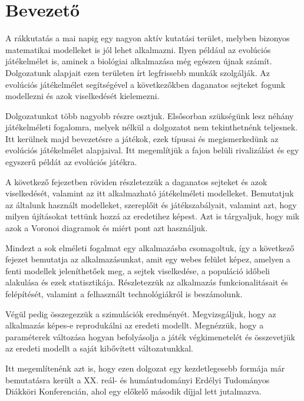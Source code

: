 \chapter{Bevezető}

A rákkutatás a mai napig egy nagyon aktív kutatási terület, melyben bizonyos matematikai modelleket is jól lehet alkalmazni. Ilyen például az evolúciós játékelmélet is, aminek a biológiai alkalmazása még egészen újnak számít. Dolgozatunk alapjait ezen területen írt legfrissebb munkák szolgálják. Az evolúciós játékelmélet segítségével a következőkben daganatos sejteket fogunk  modellezni és azok viselkedését kielemezni.

Dolgozatunkat több nagyobb részre osztjuk. Elsősorban szükségünk lesz néhány játékelméleti fogalomra, melyek nélkül a dolgozatot nem tekinthetnénk teljesnek. Itt kerülnek majd bevezetésre a játékok, ezek típusai és megismerkedünk az evolúciós játékelmélet alapjaival. Itt megemlítjük a fajon belüli rivalizálást és egy egyszerű példát az evolúciós játékra.

A következő fejezetben röviden részletezzük a daganatos sejteket és azok viselkedését, valamint az itt alkalmazható játékelméleti modelleket. Bemutatjuk az általunk használt modelleket, szereplőit és játékszabályait, valamint azt, hogy milyen újításokat tettünk hozzá az eredetihez képest. Azt is tárgyaljuk, hogy mik azok a Voronoi diagramok és miért pont azt használjuk.

Mindezt a sok elméleti fogalmat egy alkalmazásba csomagoltuk, így a következő fejezet bemutatja az alkalmazásunkat, amit egy webes felület képez, amelyen a fenti modellek jeleníthetőek meg, a sejtek viselkedése, a populáció időbeli alakulása és ezek statisztikája. Részletezzük az alkalmazás funkcionalitásait és felépítését, valamint a felhasznált technológiákról is beszámolunk.

Végül pedig összegezzük a szimulációk eredményét. Megvizsgáljuk, hogy az alkalmazás képes-e reprodukálni az eredeti modellt. Megnézzük, hogy a paraméterek változása hogyan befolyásolja a játék végkimenetelét és összevetjük az eredeti modellt a saját kibővített változatunkkal.

Itt megemlítenénk azt is, hogy ezen dolgozat egy kezdetlegesebb formája már bemutatásra került a XX. reál- és humántudományi Erdélyi Tudományos Diákköri Konferencián, ahol egy előkelő második díjjal lett jutalmazva.